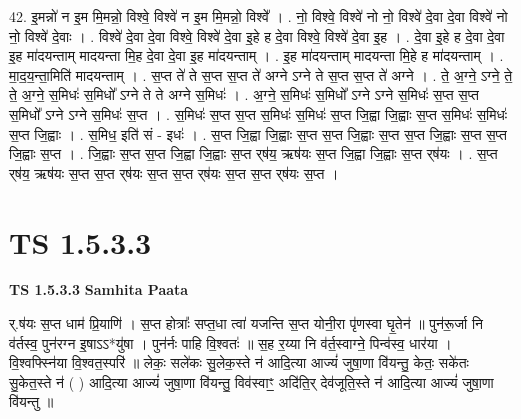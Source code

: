 \documentclass[17pt]{extarticle}
\begin{document}
42. इ॒मन्नो॑ न इ॒म मि॒मन्नो॒ विश्वे॒ विश्वे॑ न इ॒म मि॒मन्नो॒ विश्वे᳚ । . नो॒ विश्वे॒ विश्वे॑ नो नो॒ विश्वे॑ दे॒वा दे॒वा विश्वे॑ नो नो॒ विश्वे॑ दे॒वाः । . विश्वे॑ दे॒वा दे॒वा विश्वे॒ विश्वे॑ दे॒वा इ॒हे ह दे॒वा विश्वे॒ विश्वे॑ दे॒वा इ॒ह । . दे॒वा इ॒हे ह दे॒वा दे॒वा इ॒ह मा॑दयन्ताम् मादयन्ता मि॒ह दे॒वा दे॒वा इ॒ह मा॑दयन्ताम् । . इ॒ह मा॑दयन्ताम् मादयन्ता मि॒हे ह मा॑दयन्ताम् । . मा॒द॒य॒न्ता॒मिति॑ मादयन्ताम् । . स॒प्त ते॑ ते स॒प्त स॒प्त ते॑ अग्ने ऽग्ने ते स॒प्त स॒प्त ते॑ अग्ने । . ते॒ अ॒ग्ने॒ ऽग्ने॒ ते॒ ते॒ अ॒ग्ने॒ स॒मिधः॑ स॒मिधो᳚ ऽग्ने ते ते अग्ने स॒मिधः॑ । . अ॒ग्ने॒ स॒मिधः॑ स॒मिधो᳚ ऽग्ने ऽग्ने स॒मिधः॑ स॒प्त स॒प्त स॒मिधो᳚ ऽग्ने ऽग्ने स॒मिधः॑ स॒प्त । . स॒मिधः॑ स॒प्त स॒प्त स॒मिधः॑ स॒मिधः॑ स॒प्त जि॒ह्वा जि॒ह्वाः स॒प्त स॒मिधः॑ स॒मिधः॑ स॒प्त जि॒ह्वाः । . स॒मिध॒ इति॑ सं - इधः॑ । . स॒प्त जि॒ह्वा जि॒ह्वाः स॒प्त स॒प्त जि॒ह्वाः स॒प्त स॒प्त जि॒ह्वाः स॒प्त स॒प्त जि॒ह्वाः स॒प्त । . जि॒ह्वाः स॒प्त स॒प्त जि॒ह्वा जि॒ह्वाः स॒प्त र्‌ष॑य॒ ऋष॑यः स॒प्त जि॒ह्वा जि॒ह्वाः स॒प्त र्‌ष॑यः । . स॒प्त र्‌ष॑य॒ ऋष॑यः स॒प्त स॒प्त र्‌ष॑यः स॒प्त स॒प्त र्‌ष॑यः स॒प्त स॒प्त र्‌ष॑यः स॒प्त । \newline
\pagebreak
{}

\section{ TS 1.5.3.3 }

\textbf{TS 1.5.3.3 } \newline
\textbf{Samhita Paata} \newline

र्.ष॑यः स॒प्त धाम॑ प्रि॒याणि॑ । स॒प्त होत्राः᳚ सप्त॒धा त्वा॑ यजन्ति स॒प्त योनी॒रा पृ॑णस्वा घृ॒तेन॑ ॥ पुन॑रू॒र्जा नि व॑र्तस्व॒ पुन॑रग्न इ॒षाऽऽ*यु॑षा । पुन॑र्नः पाहि वि॒श्वतः॑ ॥ स॒ह र॒य्या नि व॑र्त॒स्वाग्ने॒ पिन्व॑स्व॒ धार॑या । वि॒श्वफ्स्नि॑या वि॒श्वत॒स्परि॑ ॥ लेकः॒ सले॑कः सु॒लेक॒स्ते न॑ आदि॒त्या आज्यं॑ जुषा॒णा वि॑यन्तु॒ केतः॒ सके॑तः सु॒केत॒स्ते न॑ ( ) आदि॒त्या आज्यं॑ जुषा॒णा वि॑यन्तु॒ विव॑स्वाꣳ॒॒ अदि॑ति॒र् देव॑जूति॒स्ते न॑ आदि॒त्या आज्यं॑ जुषा॒णा वि॑यन्तु ॥ \newline
\end{document}
